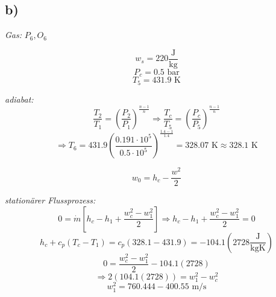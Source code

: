 

\subsection*{b)}
\textit{Gas:} \(P_6, O_6\)

\[
w_s = 220 \frac{\text{J}}{\text{kg}}
\]
\[
P_c = 0.5 \text{ bar}
\]
\[
T_5 = 431.9 \text{ K}
\]

\textit{adiabat:}
\[
\frac{T_2}{T_1} = \left( \frac{P_2}{P_1} \right)^{\frac{n-1}{n}} \Rightarrow \frac{T_c}{T_5} = \left( \frac{P_c}{P_5} \right)^{\frac{n-1}{n}}
\]
\[
\Rightarrow T_6 = 431.9 \left( \frac{0.191 \cdot 10^5}{0.5 \cdot 10^5} \right)^{\frac{1.4-1}{1.4}} = 328.07 \text{ K} \approx 328.1 \text{ K}
\]

\[
w_0 = h_c - \frac{w^2}{2}
\]

\textit{stationärer Flussprozess:}
\[
0 = \dot{m} \left[ h_c - h_1 + \frac{w_c^2 - w_1^2}{2} \right] \Rightarrow h_c - h_1 + \frac{w_c^2 - w_1^2}{2} = 0
\]
\[
h_c + c_p \left( T_c - T_1 \right) = c_p \left( 328.1 - 431.9 \right) = -104.1 (2728 \frac{\text{J}}{\text{kgK}})
\]
\[
0 = \frac{w_c^2 - w_1^2}{2} - 104.1 (2728)
\]
\[
\Rightarrow 2 (104.1 (2728)) = w_1^2 - w_c^2
\]
\[
w_1^2 = 760.444 - 400.55 \text{ m/s}
\]
